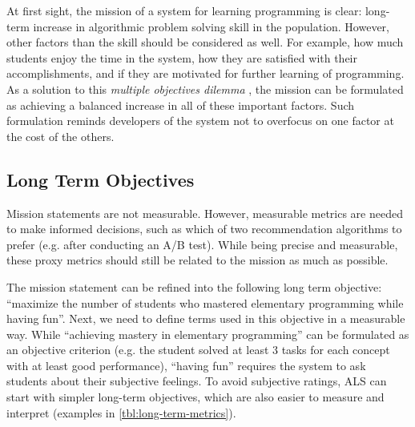 At first sight, the mission of a system for learning programming is clear:
  long-term increase in algorithmic problem solving skill in the population.
However, other factors than the skill should be considered as well.
For example, how much students enjoy the time in the system,
  how they are satisfied with their accomplishments,
  and if they are motivated for further learning of programming.
As a solution to this \emph{multiple objectives dilemma} \cite[][Rule 39]{google-ml-rules},
  the mission can be formulated as achieving a balanced increase in all
  of these important factors.
Such formulation reminds developers of the system not to overfocus on one factor
  at the cost of the others.


\subsection{Long Term Objectives}
\label{sec:long-term-objectives}


Mission statements are not measurable.
However, measurable metrics are needed to make informed decisions,
such as which of two recommendation algorithms to prefer
(e.g. after conducting an A/B test). %
While being precise and measurable, these proxy metrics
should still be related to the mission as much as possible.

The mission statement can be refined into the following
  long term objective: ``maximize the number of students
  who mastered elementary programming while having fun''.  %
Next, we need to define terms used in this objective in a measurable way.
While ``achieving mastery in elementary programming'' can be
  formulated as an objective criterion
  (e.g. the student solved at least 3 tasks for each concept with at least good performance),
  ``having fun'' requires the system to ask students about their subjective feelings.
To avoid subjective ratings, ALS can start with simpler long-term objectives,
which are also easier to measure and interpret
(examples in \cref{tbl:long-term-metrics}).

